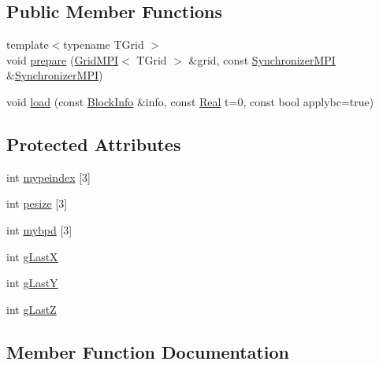\subsection*{Public Member Functions}
\begin{DoxyCompactItemize}
\item 
{\footnotesize template$<$typename T\+Grid $>$ }\\void \hyperlink{class_block_lab_m_p_i_a49e9b846d16c1c3f177b6ff067bc791c}{prepare} (\hyperlink{class_grid_m_p_i}{Grid\+M\+P\+I}$<$ T\+Grid $>$ \&grid, const \hyperlink{class_synchronizer_m_p_i}{Synchronizer\+M\+P\+I} \&\hyperlink{class_synchronizer_m_p_i}{Synchronizer\+M\+P\+I})
\item 
void \hyperlink{class_block_lab_m_p_i_a9695a460545974a0aa473039c3876765}{load} (const \hyperlink{struct_block_info}{Block\+Info} \&info, const \hyperlink{_h_d_f5_dumper_8h_a445a5f0e2a34c9d97d69a3c2d1957907}{Real} t=0, const bool applybc=true)
\end{DoxyCompactItemize}
\subsection*{Protected Attributes}
\begin{DoxyCompactItemize}
\item 
int \hyperlink{class_block_lab_m_p_i_a346371e08c48393a09a60188aa210828}{mypeindex} \mbox{[}3\mbox{]}
\item 
int \hyperlink{class_block_lab_m_p_i_a3c58102452df2ae20110af79d504693e}{pesize} \mbox{[}3\mbox{]}
\item 
int \hyperlink{class_block_lab_m_p_i_a11a592341f9c28f07809f0d950512fe5}{mybpd} \mbox{[}3\mbox{]}
\item 
int \hyperlink{class_block_lab_m_p_i_a41646b94f197315e4c39c5155ee939eb}{g\+Last\+X}
\item 
int \hyperlink{class_block_lab_m_p_i_afc336a0d08b78a9196eb24701816d6c8}{g\+Last\+Y}
\item 
int \hyperlink{class_block_lab_m_p_i_a8b9247a3ec2caad18896f597b98b7103}{g\+Last\+Z}
\end{DoxyCompactItemize}


\subsection{Member Function Documentation}
\hypertarget{class_block_lab_m_p_i_a9695a460545974a0aa473039c3876765}{}
